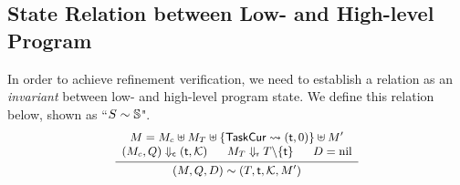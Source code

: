 % 

\subsection{State Relation between Low- and High-level Program}
\label{subsec:state-rel}
In order to achieve refinement verification, we need to 
establish a relation as an {\it invariant} 
between low- and high-level program state. 
We define this relation below, shown as 
``${S} \sim {\mathbb{S}}$". 
\[
    \small
    \infer
    {
        \stateRel{(\Mem, \Rstate, \DBuf)}
            {(\thrdpool, \thrdid, \hthrdlocalst, \Mem')}
    }
    {
        \begin{array}{c}
            \Mem = \Mem_c \uplus \Mem_T \uplus 
                \{ \TaskCur \rightsquigarrow (\thrdid, 0) \}
                \uplus \Mem' \\
            \curStRel{(\Mem_c, \Rstate)}{(\thrdid, \hthrdlocalst)}
            \quad \ \ 
            \rdyStRel{\Mem_T}{\thrdpool \backslash \{ \thrdid \}}
            \quad \ \ 
            \DBuf = \nil
        \end{array}
    }
\]

